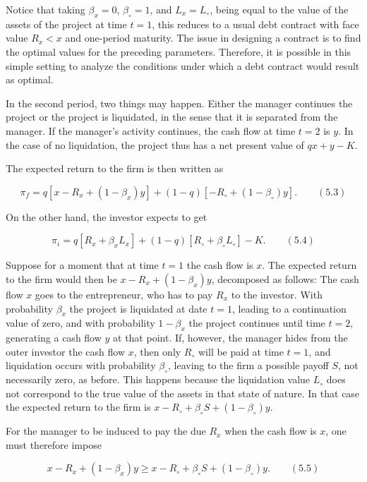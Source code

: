 \documentclass[11pt,a4paper]{article}
\begin{document}
Notice that taking \(\beta_x = 0\), \(\beta_\circ = 1\), and \(L_x = L_\circ\), being equal to the
value of the assets of the project at time \(t = 1\), this reduces to a usual debt contract with
face value \(R_x < x\) and one-period maturity. The issue in designing a contract is to find the
optimal values for the preceding parameters. Therefore, it is possible in this simple setting to
analyze the conditions under which a debt contract would result as optimal.

In the second period, two things may happen. Either the manager continues the project or the project
is liquidated, in the sense that it is separated from the manager. If the manager's activity
continues, the cash flow at time \(t = 2\) is \(y\). In the case of no liquidation, the project thus
has a net present value of \(qx + y - K\).

The expected return to the firm is then written as

\[\pi_f = q[x - R_x + (1 - \beta_x)y] + (1 - q)[-R_\circ + (1 - \beta_\circ)y]. \qquad (5.3)\]

On the other hand, the investor expects to get

\[\pi_i = q[R_x + \beta_x L_x] + (1 - q)[R_\circ + \beta_\circ L_\circ] - K. \qquad (5.4)\]

Suppose for a moment that at time \(t = 1\) the cash flow is \(x\). The expected return to the firm
would then be \(x - R_x + (1 - \beta_x)y\), decomposed as follows: The cash flow \(x\) goes to the
entrepreneur, who has to pay \(R_x\) to the investor. With probability \(\beta_x\) the project is
liquidated at date \(t = 1\), leading to a continuation value of zero, and with probability
\(1 - \beta_x\) the project continues until time \(t = 2\), generating a cash flow \(y\) at that
point. If, however, the manager hides from the outer investor the cash flow \(x\), then only
\(R_\circ\) will be paid at time \(t = 1\), and liquidation occurs with probability \(\beta_\circ\),
leaving to the firm a possible payoff \(S\), not necessarily zero, as before. This happens because
the liquidation value \(L_\circ\) does not correspond to the true value of the assets in that state
of nature. In that case the expected return to the firm is
\(x - R_\circ + \beta_\circ S + (1 - \beta_\circ)y\).

For the manager to be induced to pay the due \(R_x\) when the cash flow is \(x\), one must therefore
impose

\[x - R_x + (1 - \beta_x)y \geq x - R_\circ + \beta_\circ S + (1 - \beta_\circ)y. \qquad (5.5)\]
\end{document}
